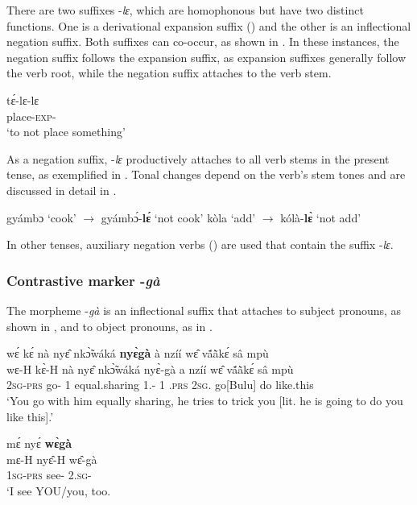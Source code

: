 There are two suffixes -{\itshape lɛ}, which are homophonous but have two distinct functions. One is a derivational expansion suffix () and the other is an inflectional negation suffix. Both suffixes can co-occur, as shown in . In these instances, the negation suffix follows the expansion suffix, as expansion suffixes generally follow the verb root, while the negation suffix attaches to the verb stem.  

\ea \label{EXPNEG}
  \gll  tɛ́-lɛ-lɛ \\
      place-\textsc{exp}-{\NEG} \\
\trans `to not place something'
\z

As a negation suffix, -{\itshape lɛ} productively attaches to all verb stems in the present tense, as exemplified in . Tonal changes depend on the verb's stem tones and are discussed in detail in .

\ea  \label{negle}
\ea  gyámbɔ `cook' $\rightarrow$ gyámbɔ́-{\bfseries lɛ́} `not cook'
\ex kòla `add' $\rightarrow$ kólà-{\bfseries lɛ̀} `not add'
\z
\z

\noindent In other tenses, auxiliary negation verbs () are used that contain the suffix -{\itshape lɛ}. 







\subsubsection{Contrastive marker -{\itshape gà}}
\label{sec:CONTRS}

The morpheme -{\itshape gà} is an inflectional suffix that attaches to subject pronouns, as shown in , and to object pronouns, as in . 

\ea \label{122t}
  \glll wɛ́ kɛ́ nà nyɛ̂ nkɔ̃̀wáká {\bfseries nyɛ̀gà} à nzíí wɛ̂ vã́ã̀kɛ́ sâ mpù \\
         wɛ-H kɛ̀-H nà nyɛ̂ nkɔ̃̀wáká nyɛ̀-gà a nzíí wɛ̂ vã́ã̀kɛ́ sâ mpù \\
         2\textsc{sg}-\textsc{prs} go-{\R} {\COM} 1 equal.sharing 1.{\SBJ}-{\CONTR} 1 {\PROG}.\textsc{prs} 2\textsc{sg}.{\OBJ} go[Bulu] do like.this  \\
    \trans `You go with him equally sharing, he tries to trick you [lit. he is going to do you like this].'
\z

\ea \label{122s}
\glll mɛ́ nyɛ́ {\bfseries wɛ̀gà} \\
mɛ-H nyɛ̂-H wɛ̂-gà \\
1\textsc{sg}-\textsc{prs} see-{\R} 2.\textsc{sg}-{\CONTR} \\
\trans  `I see YOU/you, too. 
\z

